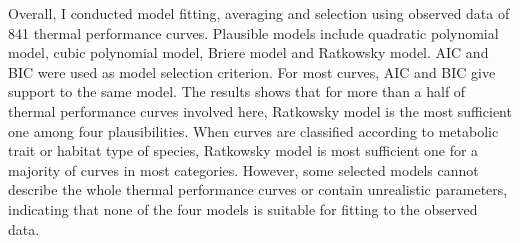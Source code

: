 \documentclass[11pt]{article}
\begin{document}
  Overall, I conducted model fitting, averaging and selection using observed data of 841 thermal performance curves. 
  Plausible models include quadratic polynomial model, cubic polynomial model, Briere model and Ratkowsky model. AIC and 
  BIC were used as model selection criterion. For most curves, AIC and BIC give support to the same model. The results shows 
  that for more than a half of thermal performance curves involved here, Ratkowsky model is the most sufficient one among 
  four plausibilities. When curves are classified according to metabolic trait or habitat type of species, Ratkowsky model is 
  most sufficient one for a majority of curves in most categories. However, some selected models cannot describe the whole 
  thermal performance curves or contain unrealistic parameters, indicating that none of the four models is suitable for 
  fitting to the observed data.
  
  \newpage
  
  
  
\end{document}

